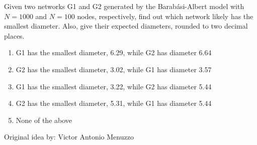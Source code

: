 
Given two networks G1 and G2 generated by the Barabási-Albert model with $N = 1000$ and $N = 100$ nodes, respectively, find out which network likely has the smallest diameter. Also, give their expected diameters, rounded to two decimal places.

\begin{enumerate}[label={\Alph*.}]
    \item G1 has the smallest diameter, 6.29, while G2 has diameter 6.64
    \item G2 has the smallest diameter, 3.02, while G1 has diameter 3.57
    \item G1 has the smallest diameter, 3.22, while G2 has diameter 5.44
    \item G2 has the smallest diameter, 5.31, while G1 has diameter 5.44
    \item None of the above
\end{enumerate}

Original idea by: Victor Antonio Menuzzo
